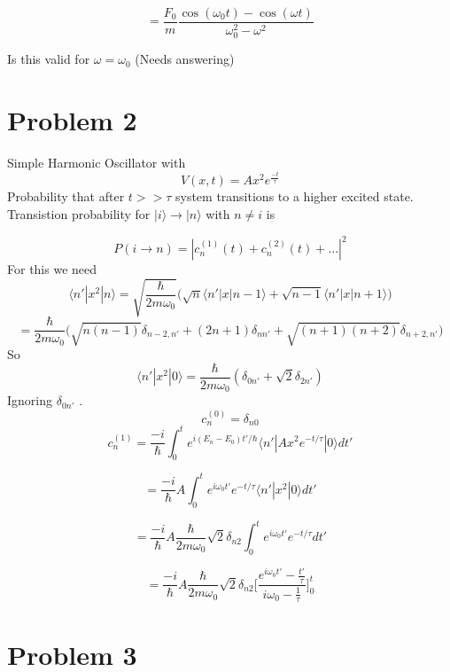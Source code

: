 \documentclass[12pt]{article}
\newcommand{\ket}[1]{\vert{#1}\rangle}
\begin{document}
$$ = \frac{F_0}{m} \frac{\cos(\omega_0 t) - \cos(\omega t)}{\omega_0^2 - \omega^2} $$

Is this valid for $\omega = \omega_0 $ (Needs answering)




\section*{Problem 2} 
Simple Harmonic Oscillator with 
$$ V(x,t) = Ax^2 e^{\frac{-t}{\tau}} $$
Probability that after $t >> \tau $ system transitions to a higher excited state. Transistion probability for $\ket{i} \rightarrow \ket{n}$ with $n \neq i$ is 

$$ P(i \rightarrow n) = | c_n^{(1)} (t) + c_n^{(2)} (t) + \ldots |^2 $$
For this we need 
$$ \langle n' | x^2 | n \rangle = \sqrt{\frac{\hbar}{2 m \omega_0}} \Big( \sqrt{n} \langle n' | x | n-1 \rangle + \sqrt{n-1} \langle n' | x | n+1 \rangle \Big) $$
$$ = \frac{\hbar}{2 m \omega_0} \Big( \sqrt{n(n-1) } \delta_{n-2, n'} + (2n +1 ) \delta_{nn'} + \sqrt{(n+1)(n+2) } \delta_{n+2, n'} \Big) $$
So 
$$ \langle n' | x^2 | 0 \rangle = \frac{\hbar}{2m\omega_0} ( \delta_{0n'} + \sqrt{2} \delta_{2n'} ) $$
Ignoring $\delta_{0n'}$ .
$$ c_n^{(0)} = \delta_{n0} $$
$$ c_n^{(1)} = \frac{-i}{\hbar} \int_0^t e^{i(E_n - E_0) t' / \hbar} \langle n' | Ax^2 e^{-t/ \tau} | 0 \rangle dt' $$

$$ = \frac{-i}{\hbar} A \int_0^t e^{i \omega_0 t'} e^{-t / \tau} \langle n' | x^2 | 0 \rangle dt' $$


$$ = \frac{-i}{\hbar} A \frac{\hbar}{2m \omega_0} \sqrt{2} \delta_{n2} \int_0^t e^{i \omega_0 t'} e^{-t / \tau} dt' $$

$$ = \frac{-i}{\hbar} A \frac{\hbar}{2 m \omega_0} \sqrt{2} \delta_{n2} \Big[ \frac{e^{i \omega_0 t'} - \frac{t'}{\tau} }{i \omega_0 - \frac{1}{\tau} } \Big]_0^t $$



\section*{Problem 3} 
\end{document}
